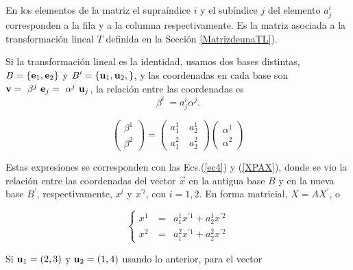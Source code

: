 \bigskip


En los elementos de la matriz el supraíndice $i$ y el subíndice $j$ del elemento $a_j^i$ corresponden a la fila y  a la columna  respectivamente. Es la matriz asociada a la transformación lineal $T$ definida en la Sección \ref{MatrizdeunaTL}).

\bigskip

\begin{example}
\label{ejuiyei}
\noindent
Si la transformación lineal  es la identidad, usamos dos bases distintas, $B=\left\{\bold{e}_1,\bold{e}_2\right\}$ y $B^\prime=\left\{\bold{u}_1,\bold{u}_2,\right\}$, y las coordenadas en cada base son  $\bold{v}= ~\beta^j~\bold{e}_j=~\alpha^j~\bold{u}_j$,   la relación entre las coordenadas es 
$$ \beta^i~ = a_j^i \alpha^j .$$


$$\left(\begin{array}{c} \beta^1 \\ \beta^2 
 \end{array}
 \right)= \left(\begin{array}{cc} a_{1}^1  &a_{2}^1  \\ a_{1}^2\ &  a_{2}^2
\end{array}
 \right)\left(\begin{array}{c} \alpha^1 \\ \alpha^2 
 \end{array}
 \right)$$
 
 \bigskip
 
Estas expresiones se  corresponden con las Ecs.(\ref{ec4}) y (\ref{XPAX}),  donde se vio la relación  entre  las coordenadas del vector $\vec{x}$ en la antigua base  $B$  y en la nueva base $B ^{\prime}$, respectivamente, $x^i$ y $x^{ \prime i}$, con $i=1,2$. En forma matricial, $X=AX^{\prime}$, o 



\begin{equation}
\left\{ \begin{array} {ccl} 
                    x^1&\ =&   a^1_{1}x^{\prime 1}+a^1_{2}x^{\prime 2}    \\
                     x^2 &\ = &a^2_{1}x^{\prime 1}+a^2_{2}x^{\prime 2} 
                   \end{array}
           \right.
\end{equation}



\bigskip

Si $\bold{u}_1=(2,3)$ y $\bold{u}_2=(1,4)$ 
usando lo anterior, para el vector  


\end{example}
